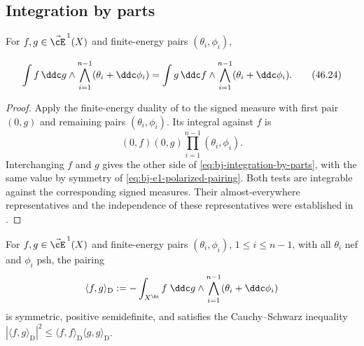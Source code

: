 \subsection{Integration by parts}
\label{sec:ch46-ibp-proper}

\begin{proposition}\label{prop:bj-integration-by-parts}
For $f,g\in\vec{\cE}^{\,1}(X)$ and finite-energy pairs
$(\theta_i,\phi_i)$,

\[
 \int f\,\ddc g\wedge\bigwedge_{i=1}^{n-1}(\theta_i+\ddc\phi_i)
 =\int g\,\ddc f\wedge\bigwedge_{i=1}^{n-1}(\theta_i+\ddc\phi_i).
\tag{46.24}\label{eq:bj-integration-by-parts}
\]
\end{proposition}

\begin{proof}
Apply the finite-energy duality of  to the signed
measure with first pair $(0,g)$ and remaining pairs
$(\theta_i,\phi_i)$.  Its integral against $f$ is
\[
 (0,f)(0,g)\prod_{i=1}^{n-1}(\theta_i,\phi_i).
\]
Interchanging $f$ and $g$ gives the other side of
\eqref{eq:bj-integration-by-parts}, with the same value by symmetry of
\eqref{eq:bj-e1-polarized-pairing}.
Both tests are integrable against the corresponding signed measures.
Their almost-everywhere representatives and the independence of these
representatives were established in .
\end{proof}

\begin{corollary}
\label{cor:ch46-dirichlet-e1}
For $f,g\in\vec\cE^{\,1}(X)$ and finite-energy pairs
$(\theta_i,\phi_i)$, $1\le i\le n-1$, with all $\theta_i$ nef and
$\phi_i$ psh, the pairing
\[
 \langle f,g\rangle_{\mathrm D}
 :=-\int_{X^{\An}}f\;\ddc g\wedge\bigwedge_{i=1}^{n-1}(\theta_i+\ddc\phi_i)
\]
is symmetric, positive semidefinite, and satisfies the Cauchy--Schwarz
inequality
$|\langle f,g\rangle_{\mathrm D}|^2\le\langle f,f\rangle_{\mathrm D}
\langle g,g\rangle_{\mathrm D}$.
\end{corollary}

